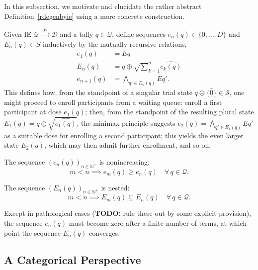 \documentclass{article}
\newcommand{\N}{\mathbb{N}}
\renewcommand{\S}{\ensuremath{\mathcal{S}}} %
\newcommand{\D}{\ensuremath{\mathcal{D}}}
\newcommand{\Q}{\ensuremath{\mathcal{Q}}}
\begin{document}
In this subsection, we motivate and elucidate the rather abstract Definition~\ref{rdegenbyie} using a more concrete construction.

\begin{nota}\label{mutrec}
  Given IE $\Q \xrightarrow{\;\;E\;\;} \D$ and a tally $q \in \Q$, define sequences $e_n(q) \in \{0,...,D\}$ and $E_n(q) \in S$ inductively by the mutually recursive relations,
  $$
  \begin{aligned}
    e_1(q) &= E q \\
    E_n(q) &= q \oplus \surd \sum_{k=1}^n \widehat{e_k(q)} \\
    e_{n+1}(q) &= \bigwedge_{q' \in E_n(q)} E q'.
  \end{aligned}
  $$
This defines how, from the standpoint of a singular trial state $q \oplus \{\widehat{0}\} \in \S$, one might proceed to enroll participants from a waiting queue: enroll a first participant at dose $e_1(q)$; then, from the standpoint of the resulting plural state $E_1(q) = q \oplus \surd\widehat{e_1(q)}$, the minimax principle suggests $e_2(q) = \bigwedge_{q' \in E_1(q)} E q'$ as a suitable dose for enrolling a second participant; this yields the even larger state $E_2(q)$, which may then admit further enrollment, and so on.
\end{nota}

\begin{fact}
  The sequence $(e_n(q))_{n \in \N^+}$ is nonincreasing:
  $$
  m < n \implies e_m(q) \ge e_n(q) \quad \forall\, q \in \Q.
  $$
\end{fact}

\begin{fact}
  The sequence $(E_n(q))_{n \in \N^+}$ is nested:
  $$
  m < n \implies E_m(q) \subseteq E_n(q) \quad \forall\, q \in \Q.
  $$
\end{fact}

Except in pathological cases (\textbf{TODO:} rule these out by some explicit provision), the sequence $e_n(q)$ must become zero after a finite number of terms, at which point the sequence $E_n(q)$ converges.

\subsection{A Categorical Perspective}
\end{document}
